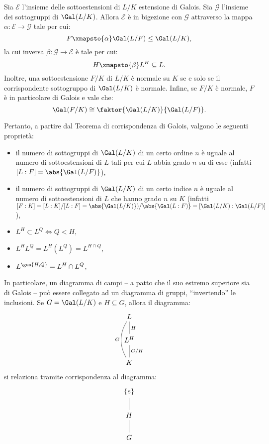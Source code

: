 \documentclass[10pt,landscape]{article}
\begin{document}
\begin{multicols}{3}
		\begin{theorem}
			Sia $\mathcal{E}$ l'insieme delle sottoestensioni
			di $L / K$ estensione di Galois. Sia
			$\mathcal{G}$ l'insieme dei sottogruppi di
			$\Gal(L / K)$. Allora $\mathcal{E}$ è
			in bigezione con $\mathcal{G}$ attraverso
			la mappa $\alpha : \mathcal{E} \to \mathcal{G}$
			tale per cui:
			\[ F \xmapsto{\alpha} \Gal(L / F) \leq
			\Gal(L / K), \]
			la cui inversa $\beta : \mathcal{G} \to \mathcal{E}$
			è tale per cui:
			\[ H \xmapsto{\beta} L^H \subseteq L. \]
			Inoltre, una sottoestensione $F / K$ di
			$L / K$ è normale su $K$ se e solo se
			il corrispondente sottogruppo di $\Gal(L / K)$
			è normale. Infine, se $F / K$ è normale,
			$F$ è in particolare di Galois e vale che:
			\[ \Gal(F / K) \cong \faktor{\Gal(L / K)}{\Gal(L / F)}. \]
		\end{theorem}
		
		Pertanto, a partire dal Teorema di corrispondenza di Galois, valgono le seguenti proprietà:

		\begin{itemize}
			\item il numero di sottogruppi di $\Gal(L / K)$ di un certo ordine $n$ è uguale al numero di sottoestensioni di $L$ tali per cui $L$ abbia
			grado $n$ su di esse (infatti $[L : F] = \abs{\Gal(L / F)}$),
			\item il numero di sottogruppi di $\Gal(L / K)$ di
			un certo indice $n$ è uguale al numero di
			sottoestensioni di $L$ che hanno grado $n$ su
			$K$ (infatti $[F : K] = [L : K] / [L : F] = \abs{\Gal(L / K)}) / \abs{\Gal(L : F)} =
			[\Gal(L / K) : \Gal(L / F)]$),
			\item $L^H \subset L^Q \iff Q < H$,
			\item $L^H L^Q = L^H(L^Q) = L^{H \cap Q}$,
			\item $L^{\gen{H, Q}} = L^H \cap L^Q$,
		\end{itemize}
	
		In particolare, un diagramma di campi -- a patto
		che il suo estremo superiore sia di Galois -- può
		essere collegato ad un diagramma di gruppi,
		``invertendo'' le inclusioni. Se
		$G = \Gal(L / K)$ e $H \subseteq G$, allora il
		diagramma:
		    \[\begin{tikzcd}
				L \\
				{L^H} \\
				K
				\arrow["G", bend left, no head, from=3-1, to=1-1]
				\arrow["{G/H}"', no head, from=3-1, to=2-1]
				\arrow["H"', no head, from=2-1, to=1-1]
			\end{tikzcd}\]
		si relaziona tramite corrispondenza al
		diagramma:
		\[\begin{tikzcd}[row sep=small]
			{\{e\}} \\
			\\
			H \\
			\\
			G
			\arrow[no head, from=1-1, to=3-1]
			\arrow[no head, from=3-1, to=5-1]
		\end{tikzcd}\]
		

\end{multicols}
\end{document}
